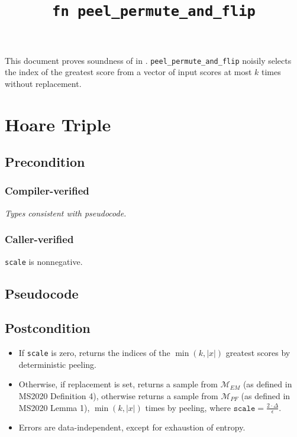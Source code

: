 \documentclass{article}
\title{\texttt{fn peel\_permute\_and\_flip}}
\author{\MichaelShoemateAuthor}
\begin{document}
\maketitle\contrib
This document proves soundness of  in .
\texttt{peel\_permute\_and\_flip} noisily selects the index of the greatest score from a vector of input scores at most $k$ times without replacement.

\section{Hoare Triple}
\subsection*{Precondition}
\subsubsection*{Compiler-verified}
\textit{Types consistent with pseudocode.}

\subsubsection*{Caller-verified}
\texttt{scale} is nonnegative.

\subsection*{Pseudocode}
\label{sec:python-pseudocode}


\subsection*{Postcondition}
\begin{theorem}
    \label{postcondition}

    \begin{itemize}
        \item If \texttt{scale} is zero, returns the indices of the $\min(k, |x|)$ greatest scores by deterministic peeling.
        \item Otherwise, if replacement is set, returns a sample from $\mathcal{M}_{EM}$ (as defined in MS2020 Definition 4),
            otherwise returns a sample from $\mathcal{M}_{PF}$ (as defined in MS2020 Lemma 1),
            $\min(k, |x|)$ times by peeling,
            where $\texttt{scale} = \frac{2 \cdot \Delta}{\epsilon}$.
        \item Errors are data-independent, except for exhaustion of entropy.
    \end{itemize}
\end{theorem}
\end{document}
